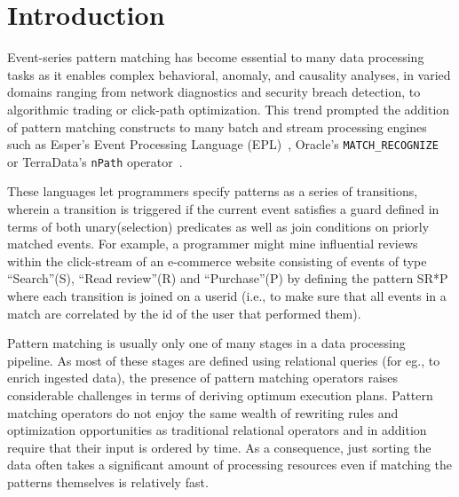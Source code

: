 \section{Introduction}


Event-series pattern matching has become essential to many data processing tasks
as it enables complex behavioral, anomaly, and causality analyses, in varied
domains ranging from network diagnostics and security breach detection, to
algorithmic trading or click-path optimization.  This trend prompted the
addition of pattern matching constructs to many batch and stream processing
engines such as Esper's Event Processing Language (EPL)~\cite{esper_epl},
Oracle's \texttt{MATCH\_RECOGNIZE}~\cite{oracle_mr} or TerraData's 
\texttt{nPath} operator~\cite{aster_npath}.

These languages let programmers specify patterns as a series of transitions,
wherein a transition 
is triggered if the current event satisfies a guard defined in terms of both 
unary\allowbreak (selection) predicates as well as join conditions on 
priorly matched 
events. 
For example, a programmer might mine
influential reviews within the click-stream of an e-commerce website consisting
of events of type ``Search''(S), ``Read review''(R) and ``Purchase''(P) by
defining the pattern SR*P where each transition is joined on a userid (i.e.,
to make sure that all events in a match are correlated by the id of the user 
that performed them).

Pattern matching is usually only one of many stages in a data processing
pipeline.  As most of these stages are defined using relational queries (for 
eg., to enrich ingested data), the presence of pattern matching operators raises
considerable challenges in terms of deriving optimum execution plans.  Pattern
matching operators do not enjoy the same wealth of rewriting rules and 
optimization opportunities as traditional relational operators and in
addition require that their input is ordered by time.  As a consequence, just
sorting the data often takes a significant amount of processing resources
even if matching the patterns themselves is relatively fast.

